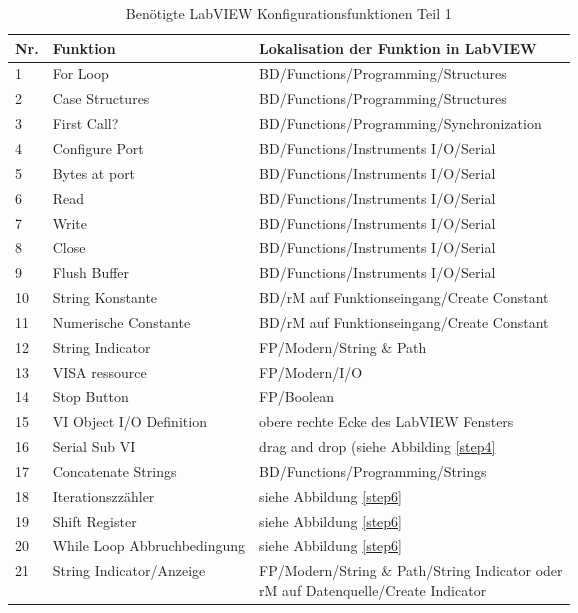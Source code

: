 \newpage
\begin{table}[hptb!]
\caption{Benötigte LabVIEW Konfigurationsfunktionen Teil 1}
\begin{center}

\begin{tabularx}{1\textwidth}{m{0.5cm}m{4.5cm}X}
\hline
Nr. & Funktion & Lokalisation der Funktion in LabVIEW \\
\hline
1 & For Loop & BD/Functions/Programming/Structures \\
2 & Case Structures & BD/Functions/Programming/Structures \\
3 & First Call? & BD/Functions/Programming/Synchronization \\
4 & Configure Port & BD/Functions/Instruments I/O/Serial \\
5 & Bytes at port & BD/Functions/Instruments I/O/Serial \\
6 & Read & BD/Functions/Instruments I/O/Serial \\
7 & Write & BD/Functions/Instruments I/O/Serial \\
8 & Close & BD/Functions/Instruments I/O/Serial \\
9 & Flush Buffer & BD/Functions/Instruments I/O/Serial \\
10 & String Konstante & BD/rM auf Funktionseingang/Create Constant \\
11 & Numerische Constante & BD/rM auf Funktionseingang/Create Constant \\
12 & String Indicator & FP/Modern/String \& Path \\
13 & VISA ressource & FP/Modern/I/O \\
14 & Stop Button & FP/Boolean \\
15 & VI Object I/O Definition & obere rechte Ecke des LabVIEW Fensters \\
16 & Serial Sub VI & drag and drop (siehe Abbilding \ref{step4} \\
17 & Concatenate Strings & BD/Functions/Programming/Strings \\
18 & Iterationszzähler & siehe Abbildung \ref{step6} \\
19 & Shift Register & siehe Abbildung \ref{step6}  \\
20 & While Loop \newline \mbox{Abbruchbedingung} &  siehe Abbildung \ref{step6} \\
21 & String Indicator/Anzeige &\makecell[l]{ FP/Modern/String \& Path/String Indicator oder\\ rM auf Datenquelle/Create Indicator}\\

\end{tabularx}
\end{center}
\end{table}
